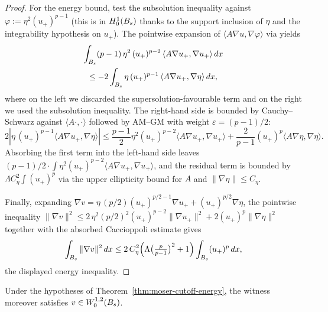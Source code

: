 \begin{proof}
For the energy bound, test the subsolution inequality against
$\varphi := \eta^{2}(u_+)^{p-1}$ (this is in $H^{1}_{0}(B_{s})$ thanks to
the support inclusion of $\eta$ and the integrability hypothesis on $u_+$).
The pointwise expansion of $\langle A\nabla u, \nabla \varphi\rangle$ via
 yields
\begin{multline*}
  \int_{B_{s}} (p-1)\,\eta^{2}\,(u_+)^{p-2}\,\langle A\nabla u_+, \nabla u_+\rangle\,dx
  \\
  \le -2\int_{B_{s}} \eta\,(u_+)^{p-1}\,\langle A\nabla u_+, \nabla \eta\rangle\,dx,
\end{multline*}
where on the left we discarded the supersolution-favourable term and on the
right we used the subsolution inequality. The right-hand side is bounded by
Cauchy--Schwarz against $\langle A\cdot, \cdot\rangle$ followed by AM--GM
with weight $\varepsilon = (p-1)/2$:
\begin{equation*}
  2|\eta\,(u_+)^{p-1}\langle A\nabla u_+,\nabla \eta\rangle|
  \le \frac{p-1}{2}\eta^{2}(u_+)^{p-2}\langle A\nabla u_+,\nabla u_+\rangle
  + \frac{2}{p-1}(u_+)^{p}\langle A\nabla \eta,\nabla \eta\rangle.
\end{equation*}
Absorbing the first term into the left-hand side leaves
$(p-1)/2 \cdot \int \eta^{2}(u_+)^{p-2}\langle A\nabla u_+,\nabla u_+\rangle$,
and the residual term is bounded by $\Lambda C_\eta^{2}\int (u_+)^{p}$ via
the upper ellipticity bound for $A$ and $\|\nabla \eta\| \le C_\eta$.

Finally, expanding $\nabla v = \eta\,(p/2)(u_+)^{p/2-1}\nabla u_+ +
(u_+)^{p/2}\nabla \eta$, the pointwise inequality
$\|\nabla v\|^{2} \le 2\,\eta^{2}(p/2)^{2}(u_+)^{p-2}\|\nabla u_+\|^{2}
+ 2(u_+)^{p}\|\nabla \eta\|^{2}$ together with the absorbed Caccioppoli
estimate gives
\begin{equation*}
  \int_{B_{s}} \|\nabla v\|^{2}\,dx
   \le 2\,C_\eta^{2}\Bigl(\Lambda\bigl(\tfrac{p}{p-1}\bigr)^{2} + 1\Bigr)
   \int_{B_{s}} (u_+)^{p}\,dx,
\end{equation*}
the displayed energy inequality.
\end{proof}

\begin{theorem}
\label{thm:moser_powerCutoff_memW01p_energy_of_subsolution}
\leanok
{}
Under the hypotheses of Theorem~\ref{thm:moser-cutoff-energy}, the witness
moreover satisfies $v \in W^{1,2}_{0}(B_{s})$.
\end{theorem}

